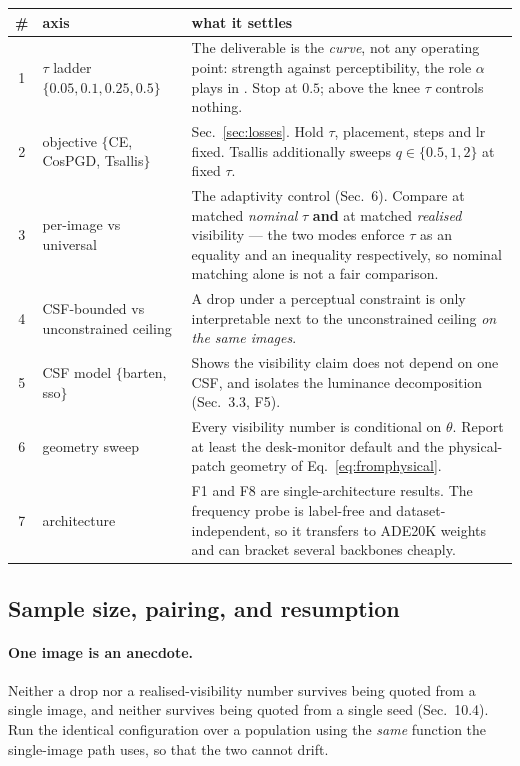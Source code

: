\documentclass[11pt,a4paper]{article}
\begin{document}
\begin{center}
\small
\begin{tabular}{@{}clL{7.6cm}@{}}
\toprule
\# & axis & what it settles \\
 & $\tau$ ladder $\{0.05,0.1,0.25,0.5\}$ &
    The deliverable is the \emph{curve}, not any operating point: strength
    against perceptibility, the role $\alpha$ plays in \citet{tan2021lap}.
    Stop at $0.5$; above the knee $\tau$ controls nothing. \\
2 & objective $\{$CE, CosPGD, Tsallis$\}$ &
    Sec.~\ref{sec:losses}. Hold $\tau$, placement, steps and lr fixed.
    Tsallis additionally sweeps $q\in\{0.5,1,2\}$ at fixed $\tau$. \\
3 & per-image vs universal &
    The adaptivity control (Sec.~6). Compare at matched \emph{nominal}
    $\tau$ \textbf{and} at matched \emph{realised} visibility --- the two
    modes enforce $\tau$ as an equality and an inequality respectively, so
    nominal matching alone is not a fair comparison. \\
4 & CSF-bounded vs unconstrained ceiling &
    A drop under a perceptual constraint is only interpretable next to the
    unconstrained ceiling \emph{on the same images}. \\
5 & CSF model $\{$barten, sso$\}$ &
    Shows the visibility claim does not depend on one CSF, and isolates the
    luminance decomposition (Sec.~3.3, F5). \\
6 & geometry sweep &
    Every visibility number is conditional on $\theta$. Report at least the
    desk-monitor default and the physical-patch geometry of
    Eq.~\eqref{eq:fromphysical}. \\
7 & architecture &
    F1 and F8 are single-architecture results. The frequency probe is
    label-free and dataset-independent, so it transfers to ADE20K weights
    and can bracket several backbones cheaply. \\
\bottomrule
\end{tabular}
\end{center}

\subsection{Sample size, pairing, and resumption}

\paragraph{One image is an anecdote.}
Neither a drop nor a realised-visibility number survives being quoted from a
single image, and neither survives being quoted from a single seed
(Sec.~10.4). Run the identical configuration over a population using the
\emph{same} function the single-image path uses, so that the two cannot
drift.
\end{document}
